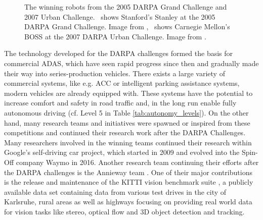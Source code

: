 \begin{figure}[t!]
	\centering
	\caption{The winning robots from the 2005 \ac{DARPA} Grand Challenge and 2007 Urban Challenge.~\protect{} shows Stanford's Stanley at the 2005 \ac{DARPA} Grand Challenge. Image from \textcite{Thrun2006},~\protect{} shows Carnegie Mellon's BOSS at the 2007 \ac{DARPA} Urban Challenge. Image from \textcite{Urmson.2008}.}
    \label{fig:darpa_chal}
\end{figure}

The technology developed for the \ac{DARPA} challenges formed the basis for commercial \ac{ADAS}, which have seen rapid progress since then and gradually made their way into series-production vehicles.
There exists a large variety of commercial systems, like e.g. \ac{ACC} or intelligent parking assistance systems, modern vehicles are already equipped with.
These systems have the potential to increase comfort and safety in road traffic and, in the long run enable fully autonomous driving (cf. Level \num{5}  in Table \ref{tab:autonomy_levels}).
On the other hand, many research teams and initiatives were spawned or inspired from these competitions and continued their research work after the \ac{DARPA} Challenges.
Many researchers involved in the winning teams continued their research within Google's self-driving car project, which started in 2009 and evolved into the Spin-Off company Waymo  in \num{2016}.
Another research team continuing their efforts after the \ac{DARPA} challenges is the Annieway team .
One of their major contributions is the release and maintenance of the KITTI vision benchmark suite \parencite{Geiger2013a}, a publicly available data set containing data from various test drives in the city of Karlsruhe, rural areas as well as highways focusing on providing real world data for vision tasks like stereo, optical flow and 3D object detection and tracking.


